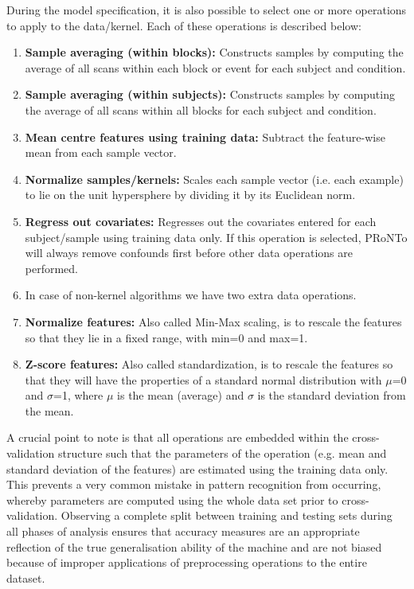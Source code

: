 During the model specification, it is also possible to select one or more operations to apply to the data/kernel. Each of these operations is described below:

\begin{enumerate}
\item \textbf{Sample averaging (within blocks):} Constructs samples by computing the average of all scans within each block or event for each subject and condition. 
\item \textbf{Sample averaging (within subjects):} Constructs samples by computing the average of all scans within all blocks for each subject and condition.
\item \textbf{Mean centre features using training data:} Subtract the feature-wise mean from each sample vector.
\item {\color{black}\textbf{Normalize samples/kernels:}} Scales each sample vector (i.e. each example) to lie on the unit hypersphere by dividing it by its Euclidean norm.
\item \textbf{Regress out covariates:} Regresses out the covariates entered for each subject/sample using training data only. If this operation is selected, PRoNTo will always remove confounds first before other data operations are performed.
\item In case of non-kernel algorithms we have two extra data operations.
\bi
\item \textbf{Normalize features:} Also called Min-Max scaling, is to rescale the features so that they lie in a fixed range, with min=0 and max=1.
\item \textbf{Z-score features:} Also called standardization, is to rescale the features so that they will have the properties of a standard normal distribution with $\mu$=0 and $\sigma$=1, where $\mu$ is the mean (average) and $\sigma$ is the standard deviation from the mean. %
\ei
\end{enumerate}


A crucial point to note is that all operations are embedded within the cross-validation structure such that the parameters of the operation (e.g. mean and standard deviation of the features) are estimated using the training data only. This prevents a very common mistake in pattern recognition from occurring, whereby parameters are computed using the whole data set prior to cross-validation. Observing a complete split between training and testing sets during all phases of analysis ensures that accuracy measures are an appropriate reflection of the true generalisation ability of the machine and are not biased because of improper applications of preprocessing operations to the entire dataset.
\\

